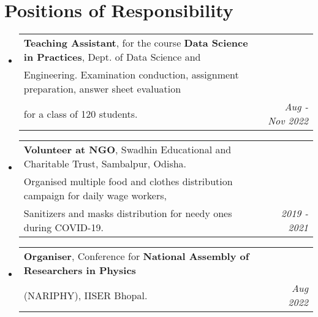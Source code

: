 \documentclass[a4paper,11pt]{article}
\makeatletter
\newcommand{\resumePOR}[3]{
\vspace{0.5mm}\item
    \begin{tabular*}{0.97\textwidth}[t]{l@{\extracolsep{\fill}}r}
        \textbf{#1}, \hspace{0.3mm}#2 & \textit{\small{#3}} 
    \end{tabular*}
    \vspace{-2mm}
}
\newcommand{\resumeSubHeadingListStart}{\begin{itemize}[leftmargin=*,labelsep=0mm]}
\newcommand{\resumeSubHeadingListEnd}{\end{itemize}}
\makeatother
\begin{document}
\section{Positions of Responsibility}
\resumeSubHeadingListStart
\resumePOR{Teaching Assistant} %
    {for the course \textbf{Data Science in Practices}, Dept. of Data Science and \\Engineering.
    Examination conduction, assignment preparation, answer sheet evaluation \\for a class of 120 students.} %
    {Aug - Nov 2022} %
    
\resumePOR{Volunteer at NGO} %
    {Swadhin Educational and Charitable Trust, Sambalpur, Odisha. \\
    Organised multiple food and clothes distribution campaign for daily wage workers,\\
    Sanitizers and masks distribution for needy ones during COVID-19.} %
    {2019 - 2021} %
    
\resumePOR{Organiser} %
    {Conference for \textbf{National Assembly of Researchers in Physics} \\(NARIPHY), IISER Bhopal.} %
    {Aug 2022} %
    

    
    
    
\resumeSubHeadingListEnd


\end{document}
